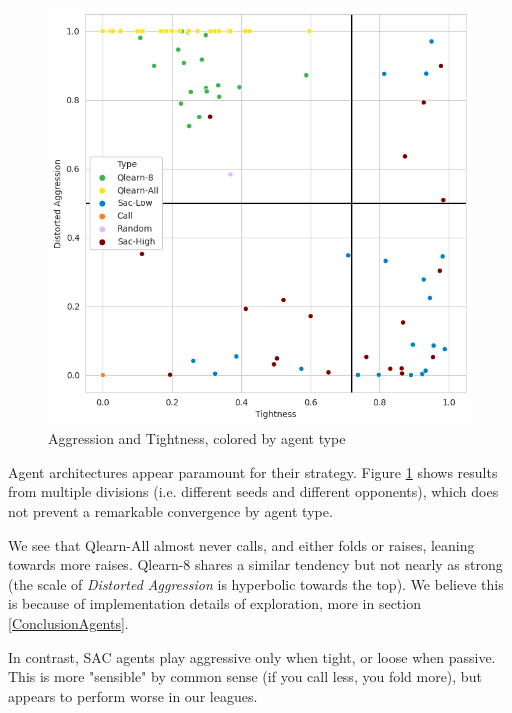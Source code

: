 \begin{figure}[H]
\centering
    \includegraphics[width=0.8\linewidth]{Results/figures/traditional_scatterplot_Type.png}
\caption{Aggression and Tightness, colored by agent type}
\label{AggTightAgentType}
\end{figure}

Agent architectures appear paramount for their strategy. Figure \ref{AggTightAgentType} shows results from multiple divisions (i.e. different seeds and different opponents), which does not prevent a remarkable convergence by agent type.

We see that Qlearn-All almost never calls, and either folds or raises, leaning towards more raises. Qlearn-8 shares a similar tendency but not nearly as strong (the scale of \textit{Distorted Aggression} is hyperbolic towards the top). We believe this is because of implementation details of exploration, more in section \ref{ConclusionAgents}.

In contrast, SAC agents play aggressive only when tight, or loose when passive. This is more "sensible" by common sense (if you call less, you fold more), but appears to perform worse in our leagues.

